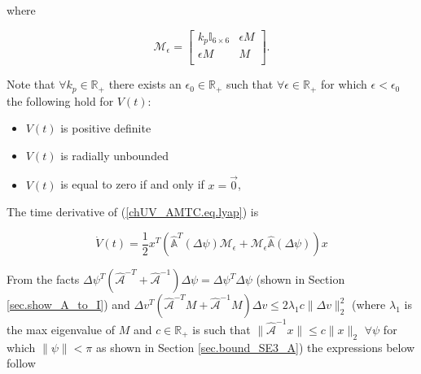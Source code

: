 \noindent where 

\begin{equation}\label{chUV_AMTC.eq.lyapM}
\mathcal{M}_\epsilon=\left[ 
\begin{array}{cc}
  k_p\mathbb{I}_{6\times 6}  & \epsilon M         \\
  \epsilon M               &    M               \\
\end{array} \right].
\end{equation}

\noindent Note that $\forall k_p\in\mathbb{R}_+$ there exists an
$\epsilon_0\in\mathbb{R_+}$ such that $\forall
\epsilon\in\mathbb{R}_+$ for which $\epsilon < \epsilon_0$ the
following hold for $V(t)$:

\begin{itemize}
\item $V(t)$ is positive definite
\item $V(t)$ is radially unbounded
\item $V(t)$ is equal to zero if and only if $x=\vec{0}$,
\end{itemize}

\noindent The time derivative of (\ref{chUV_AMTC.eq.lyap}) is 

\begin{equation} \label{chUV_AMTC.eq.lyap_dot}
\dot{V}(t)=\frac{1}{2}
x^T\left(\hat{\mathbb{A}}^{T}(\Delta\psi)\mathcal{M}_\epsilon 
        +\mathcal{M}_\epsilon\hat{\mathbb{A}}(\Delta\psi)\right) x
\end{equation}

\noindent From the facts
$\Delta\psi^T\left(\hat{\mathcal{A}}^{-T}+\hat{\mathcal{A}}^{-1}\right)\Delta
\psi=\Delta\psi^T\Delta\psi$ (shown in Section \ref{sec.show_A_to_I})
and $\Delta v^T \left(\hat{\mathcal{A}}^{-T} M +\hat{\mathcal{A}}^{-1}
  M\right)\Delta v \leq 2 \lambda_1 c \|\Delta v\|_2^2$ (where
$\lambda_1$ is the max eigenvalue of $M$ and $c\in\mathbb{R}_+$ is
such that $\|\hat{\mathcal{A}}^{-1}x\| \leq c\|x\|_2$ $\forall \psi$
for which $\|\psi\|<\pi$ as shown in Section \ref{sec.bound_SE3_A})
the expressions below follow

